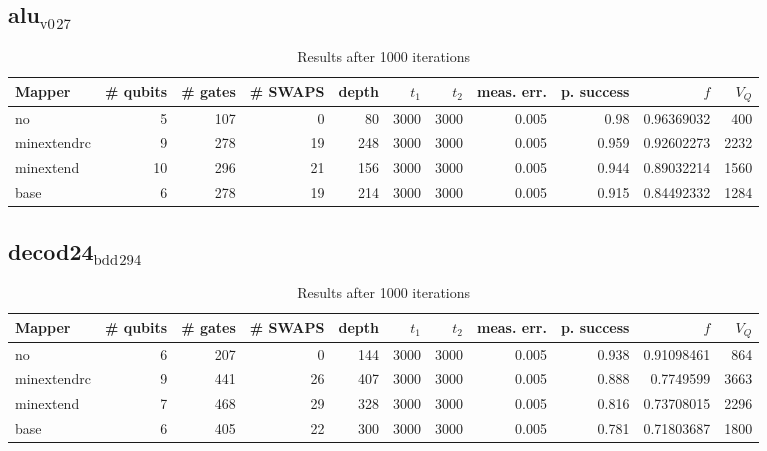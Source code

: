 \documentclass[11pt]{article}
\begin{document}
\subsection{alu\(_{\text{v0}}\)\(_{\text{27}}\)}
\label{sec:org3629c42}
\begin{table}[!htpb]
\caption{\label{tab:orga557d0a}
Results after 1000 iterations}
\centering
\begin{tabular}{lrrrrrrrrrr}
\hline
Mapper & \# qubits & \# gates & \# SWAPS & depth & \(t_1\) & \(t_2\) & meas. err. & p. success & \(f\) & \(V_Q\)\\
\hline
no & 5 & 107 & 0 & 80 & 3000 & 3000 & 0.005 & 0.98 & 0.96369032 & 400\\
\hline
minextendrc & 9 & 278 & 19 & 248 & 3000 & 3000 & 0.005 & 0.959 & 0.92602273 & 2232\\
minextend & 10 & 296 & 21 & 156 & 3000 & 3000 & 0.005 & 0.944 & 0.89032214 & 1560\\
base & 6 & 278 & 19 & 214 & 3000 & 3000 & 0.005 & 0.915 & 0.84492332 & 1284\\
\hline
\end{tabular}
\end{table}
\subsection{decod24\(_{\text{bdd}}\)\(_{\text{294}}\)}
\label{sec:orgf057ba1}
\begin{table}[!htpb]
\caption{\label{tab:org0c921f5}
Results after 1000 iterations}
\centering
\begin{tabular}{lrrrrrrrrrr}
\hline
Mapper & \# qubits & \# gates & \# SWAPS & depth & \(t_1\) & \(t_2\) & meas. err. & p. success & \(f\) & \(V_Q\)\\
\hline
no & 6 & 207 & 0 & 144 & 3000 & 3000 & 0.005 & 0.938 & 0.91098461 & 864\\
\hline
minextendrc & 9 & 441 & 26 & 407 & 3000 & 3000 & 0.005 & 0.888 & 0.7749599 & 3663\\
minextend & 7 & 468 & 29 & 328 & 3000 & 3000 & 0.005 & 0.816 & 0.73708015 & 2296\\
base & 6 & 405 & 22 & 300 & 3000 & 3000 & 0.005 & 0.781 & 0.71803687 & 1800\\
\hline
\end{tabular}
\end{table}
\end{document}
